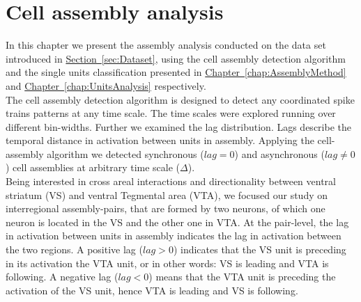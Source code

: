 \chapter{Cell assembly analysis}
\label{chap:AssemblyAnalysis}
In this chapter we present the assembly analysis conducted on the data set introduced in \hyperref[sec:Dataset]{Section~\ref*{sec:Dataset}}, using the cell assembly detection algorithm and the single units classification presented in \hyperref[chap:AssemblyMethod]{Chapter~\ref*{chap:AssemblyMethod}} and \hyperref[chap:UnitsAnalysis]{Chapter~\ref*{chap:UnitsAnalysis}} respectively.\\
The cell assembly detection algorithm is designed to detect any coordinated spike trains patterns at any time scale. The time scales were explored running over different bin-widths. Further we examined the lag distribution. Lags describe the temporal distance in activation between units in assembly. Applying the cell-assembly algorithm we detected synchronous ($lag=0$) and asynchronous ($lag\neq0$) cell assemblies at arbitrary time scale ($\Delta$).\\Being interested in cross areal interactions and directionality between ventral striatum (VS) and ventral Tegmental area (VTA), we focused our study on interregional assembly-pairs, that are formed by two neurons, of which one neuron is located in the VS and the other one in VTA. At the pair-level, the lag in activation between units in assembly indicates the lag in activation between the two regions. A positive lag ($lag>0$) indicates that the VS unit is preceding in its activation the VTA unit, or in other words: VS is leading and VTA is following. A negative lag ($lag<0$) means that the VTA unit is preceding the activation of the VS unit, hence VTA is leading and VS is following.
